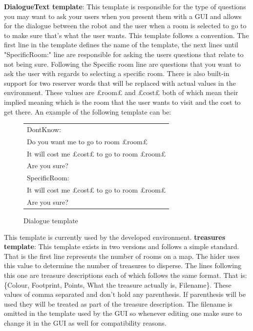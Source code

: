 		\textbf{DialogueText template}: This template is responsible for the type of questions you may want to ask your users when you present them with a GUI and allows for the dialogue between the robot and the user when a room is selected to go to to make sure that's what the user wants. This template follows a convention. The first line in the template defines the name of the template, the next lines until "SpecificRoom:" line are responsible for asking the users questions that relate to not being sure. Following the Specific room line are questions that you want to ask the user with regards to selecting a specific room. There is also built-in support for two reserver words that will be replaced with actual values in the environment. These values are £room£ and £cost£ both of which mean their implied meaning which is the room that the user wants to visit and the cost to get there. An example of the following template can be:

		\begin{figure}[!htp]
		\centering
		\begin{tabular} {l}
			DontKnow: \\
			Do you want me to go to room £room£ \\
			It will cost me £cost£ to go to room £room£ \\
			Are you sure? \\
			SpecificRoom: \\
			It will cost me £cost£ to go to room £room£ \\
			Are you sure? \\
		\end{tabular}
		\caption{Dialogue template}
		\end{figure}

		This template is currently used by the developed environment.
		\textbf{treasures template}: This template exists in two versions and follows a simple standard. That is the first line represents the number of rooms on a map. The hider uses this value to determine the number of treasures to disperse. The lines following this one are treasure descriptions each of which follows the same format. That is: \{Colour, Footprint, Points, What the treasure actually is, Filename\}. These values of comma separated and don't hold any parenthesis. If parenthesis will be used they will be treated as part of the treasure description. The filename is omitted in the template used by the GUI so whenever editing one make sure to change it in the GUI as well for compatibility reasons.


